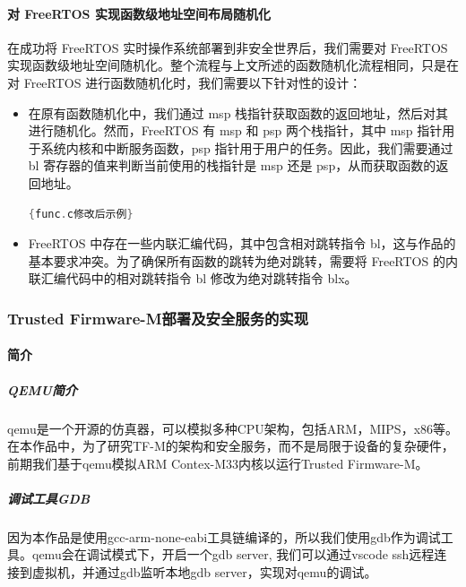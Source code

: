 \documentclass[UTF8,12pt,a4paper]{ctexart}
\numberwithin{figure}{section}
\begin{document}
\paragraph{对 FreeRTOS 实现函数级地址空间布局随机化}
\par 在成功将 FreeRTOS 实时操作系统部署到非安全世界后，我们需要对 FreeRTOS 实现函数级地址空间随机化。整个流程与上文所述的函数随机化流程相同，只是在对 FreeRTOS 进行函数随机化时，我们需要以下针对性的设计：
\begin{itemize}
    \item 在原有函数随机化中，我们通过 msp 栈指针获取函数的返回地址，然后对其进行随机化。然而，FreeRTOS 有 msp 和 psp 两个栈指针，其中 msp 指针用于系统内核和中断服务函数，psp 指针用于用户的任务。因此，我们需要通过 bl 寄存器的值来判断当前使用的栈指针是 msp 还是 psp，从而获取函数的返回地址。
    \begin{lstlisting}[language=C]{func.c修改后示例}
    \end{lstlisting}
    \item FreeRTOS 中存在一些内联汇编代码，其中包含相对跳转指令 bl，这与作品的基本要求冲突。为了确保所有函数的跳转为绝对跳转，需要将 FreeRTOS 的内联汇编代码中的相对跳转指令 bl 修改为绝对跳转指令 blx。
\end{itemize}

\subsubsection{Trusted Firmware-M部署及安全服务的实现}
\paragraph{简介}
\subparagraph{QEMU简介}
\par qemu是一个开源的仿真器，可以模拟多种CPU架构，包括ARM，MIPS，x86等。在本作品中，为了研究TF-M的架构和安全服务，而不是局限于设备的复杂硬件，前期我们基于qemu模拟ARM Contex-M33内核以运行Trusted Firmware-M。
\subparagraph{调试工具GDB}
因为本作品是使用gcc-arm-none-eabi工具链编译的，所以我们使用gdb作为调试工具。qemu会在调试模式下，开启一个gdb server, 我们可以通过vscode ssh远程连接到虚拟机，并通过gdb监听本地gdb server，实现对qemu的调试。
\end{document}
